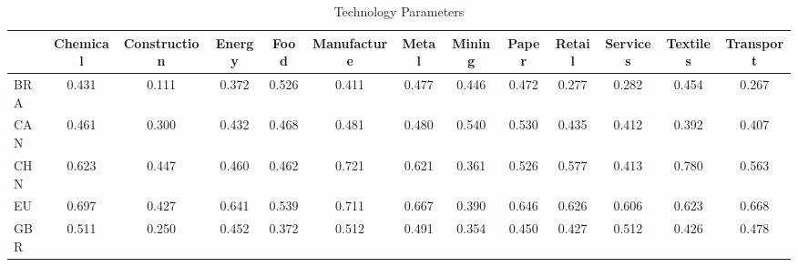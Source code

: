 \begin{table}[htbp]
\centering
\caption{Technology Parameters} 
\label{tab:technology}
\begin{tabular}{lcccccccccccc}
  \hline
 & Chemical & Construction & Energy & Food & Manufacture & Metal & Mining & Paper & Retail & Services & Textiles & Transport \\ 
  \hline
BRA & \textcolor[RGB]{157,102,98}{0.431} & \textcolor[RGB]{249,161,6}{0.111} & \textcolor[RGB]{204,132,51}{0.372} & \textcolor[RGB]{91,59,164}{0.526} & \textcolor[RGB]{183,118,72}{0.411} & \textcolor[RGB]{115,74,140}{0.477} & \textcolor[RGB]{147,95,108}{0.446} & \textcolor[RGB]{117,76,138}{0.472} & \textcolor[RGB]{238,154,17}{0.277} & \textcolor[RGB]{236,153,19}{0.282} & \textcolor[RGB]{130,84,125}{0.454} & \textcolor[RGB]{240,155,15}{0.267} \\ 
  CAN & \textcolor[RGB]{123,80,132}{0.461} & \textcolor[RGB]{227,147,28}{0.300} & \textcolor[RGB]{155,100,100}{0.432} & \textcolor[RGB]{119,77,136}{0.468} & \textcolor[RGB]{106,69,149}{0.481} & \textcolor[RGB]{108,70,147}{0.480} & \textcolor[RGB]{81,52,174}{0.540} & \textcolor[RGB]{87,56,168}{0.530} & \textcolor[RGB]{153,99,102}{0.435} & \textcolor[RGB]{181,117,74}{0.412} & \textcolor[RGB]{193,125,62}{0.392} & \textcolor[RGB]{185,120,70}{0.407} \\ 
  CHN & \textcolor[RGB]{53,34,202}{0.623} & \textcolor[RGB]{144,94,110}{0.447} & \textcolor[RGB]{125,81,130}{0.460} & \textcolor[RGB]{121,78,134}{0.462} & \textcolor[RGB]{11,7,244}{0.721} & \textcolor[RGB]{57,37,198}{0.621} & \textcolor[RGB]{208,135,47}{0.361} & \textcolor[RGB]{89,58,166}{0.526} & \textcolor[RGB]{70,45,185}{0.577} & \textcolor[RGB]{178,115,76}{0.413} & \textcolor[RGB]{2,1,253}{0.780} & \textcolor[RGB]{74,48,181}{0.563} \\ 
  EU & \textcolor[RGB]{21,14,234}{0.697} & \textcolor[RGB]{162,104,94}{0.427} & \textcolor[RGB]{42,27,212}{0.641} & \textcolor[RGB]{83,54,172}{0.539} & \textcolor[RGB]{17,11,238}{0.711} & \textcolor[RGB]{32,21,223}{0.667} & \textcolor[RGB]{195,126,60}{0.390} & \textcolor[RGB]{40,26,215}{0.646} & \textcolor[RGB]{49,32,206}{0.626} & \textcolor[RGB]{59,38,196}{0.606} & \textcolor[RGB]{55,36,200}{0.623} & \textcolor[RGB]{30,19,225}{0.668} \\ 
  GBR & \textcolor[RGB]{100,65,155}{0.511} & \textcolor[RGB]{242,157,13}{0.250} & \textcolor[RGB]{136,88,119}{0.452} & \textcolor[RGB]{202,131,53}{0.372} & \textcolor[RGB]{98,63,157}{0.512} & \textcolor[RGB]{104,67,151}{0.491} & \textcolor[RGB]{210,136,45}{0.354} & \textcolor[RGB]{142,92,113}{0.450} & \textcolor[RGB]{164,106,91}{0.427} & \textcolor[RGB]{96,62,159}{0.512} & \textcolor[RGB]{166,107,89}{0.426} & \textcolor[RGB]{113,73,142}{0.478} \\ 

\end{tabular}
\end{table}

